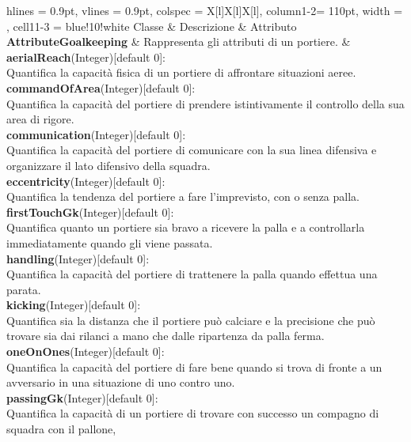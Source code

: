 \begin{tblr}{
    hlines = {0.9pt}, vlines = {0.9pt}, colspec = {X[l]X[l]X[l]}, column{1-2}= {110pt},
    width = \textwidth, cell{1}{1-3} = {blue!10!white}
}
	{
		Classe
	}
	&
	{
		Descrizione
	}
	&
	{
		Attributo
	}
	\\
	{
		\textbf{AttributeGoalkeeping}
	}
	&
	{
		Rappresenta gli attributi di un portiere.
	}
	&
	{
		\textbf{aerialReach}(Integer)[default 0]:\\
			Quantifica la capacità fisica di un portiere
			di affrontare situazioni aeree.\\
		\medskip\textbf{commandOfArea}(Integer)[default 0]:\\
			Quantifica la capacità del portiere
			di prendere istintivamente il controllo
			della sua area di rigore.\\
		\medskip\textbf{communication}(Integer)[default 0]:\\
			 Quantifica la capacità del portiere di comunicare
			 con la sua linea difensiva e organizzare
			 il lato difensivo della squadra.\\
		\medskip\textbf{eccentricity}(Integer)[default 0]:\\
			Quantifica la tendenza del portiere
			a fare l'imprevisto, con o senza palla.\\
		\medskip\textbf{firstTouchGk}(Integer)[default 0]:\\
			Quantifica quanto un portiere sia bravo
			a ricevere la palla e a controllarla
			immediatamente quando gli viene passata.\\
		\medskip\textbf{handling}(Integer)[default 0]:\\
			Quantifica la capacità del portiere
			di trattenere la palla quando effettua una parata.\\
		\medskip\textbf{kicking}(Integer)[default 0]:\\
			Quantifica sia la distanza che
			il portiere può calciare e la precisione che
			può trovare sia dai rilanci a mano che
			dalle ripartenza da palla ferma.\\
		\medskip\textbf{oneOnOnes}(Integer)[default 0]:\\
			Quantifica la capacità del portiere
			di fare bene quando si trova
			di fronte a un avversario in una situazione
			di uno contro uno.\\
		\medskip\textbf{passingGk}(Integer)[default 0]:\\
			Quantifica la capacità di un portiere di trovare
			con successo un compagno di squadra con il pallone,
}
\end{tblr}
